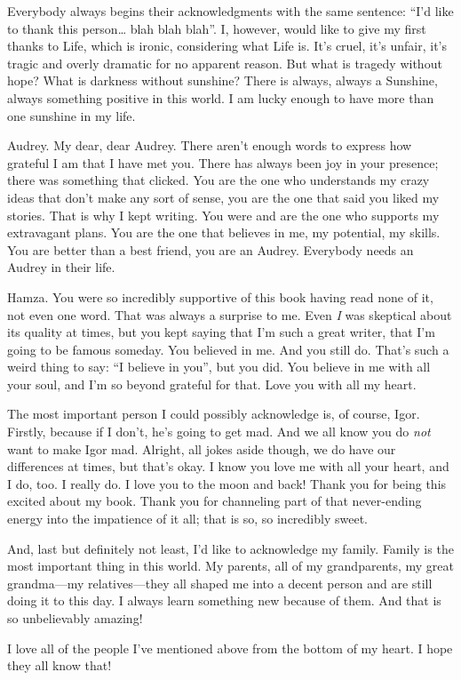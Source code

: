 Everybody always begins their acknowledgments with the same sentence: “I'd like to thank this person… blah blah blah”. I, however, would like to give my first thanks to Life, which is ironic, considering what Life is. It's cruel, it's unfair, it's tragic and overly dramatic for no apparent reason. But what is tragedy without hope? What is darkness without sunshine? There is always, always a Sunshine, always something positive in this world. I am lucky enough to have more than one sunshine in my life.

Audrey. My dear, dear Audrey. There aren't enough words to express how grateful I am that I have met you. There has always been joy in your presence; there was something that clicked. You are the one who understands my crazy ideas that don't make any sort of sense, you are the one that said you liked my stories. That is why I kept writing. You were and are the one who supports my extravagant plans. You are the one that believes in me, my potential, my skills. You are better than a best friend, you are an Audrey. Everybody needs an Audrey in their life.

Hamza. You were so incredibly supportive of this book having read none of it, not even one word. That was always a surprise to me. Even \textit{I} was skeptical about its quality at times, but you kept saying that I'm such a great writer, that I'm going to be famous someday. You believed in me. And you still do. That's such a weird thing to say: “I believe in you”, but you did. You believe in me with all your soul, and I'm so beyond grateful for that. Love you with all my heart.

The most important person I could possibly acknowledge is, of course, Igor. Firstly, because if I don't, he's going to get mad. And we all know you do \textit{not} want to make Igor mad. Alright, all jokes aside though, we do have our differences at times, but that's okay. I know you love me with all your heart, and I do, too. I really do. I love you to the moon and back! Thank you for being this excited about my book. Thank you for channeling part of that never-ending energy into the impatience of it all; that is so, so incredibly sweet.

And, last but definitely not least, I'd like to acknowledge my family. Family is the most important thing in this world. My parents, all of my grandparents, my great grandma—my relatives—they all shaped me into a decent person and are still doing it to this day. I always learn something new because of them. And that is so unbelievably amazing!

I love all of the people I've mentioned above from the bottom of my heart. I hope they all know that!